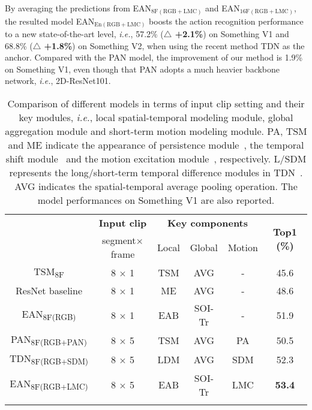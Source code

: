 By averaging the predictions from EAN$_{\operatorname{8F(RGB+LMC)}}$ and EAN$_{\operatorname{16F(RGB+LMC)}}$, the resulted model EAN$_{\operatorname{En(RGB+LMC)}}$ boosts the action recognition performance to a new state-of-the-art level, \textit{i.e.}, 57.2\% (\textbf{$\bigtriangleup$ +2.1\%}) on Something V1 and 68.8\% (\textbf{$\bigtriangleup$ +1.8\%}) on Something V2, when using the recent method TDN as the anchor.
Compared with the PAN model, the improvement of our method is 1.9\% on Something V1, even though that PAN adopts a much heavier backbone network, \textit{i.e.}, 2D-ResNet101.


		\begin{table}[!tb]
			\caption{Comparison of different models in terms of input clip setting and their key modules, \textit{i.e.}, local spatial-temporal modeling module, global aggregation module and short-term motion modeling module.
				PA, TSM and ME indicate the appearance of persistence module~\cite{zhang2020pan}, the temporal shift module~\cite{lin2019tsm} and 
				the motion excitation module~\cite{li2020tea}, respectively. 
				L/SDM represents the long/short-term temporal difference modules in TDN~\cite{wang2020tdn}.
				AVG indicates the spatial-temporal average pooling operation.
				The model performances on Something V1 are also reported.
			}
		\centering
			\renewcommand{\arraystretch}{1.0}
			\setlength{\tabcolsep}{0.7mm}
			\begin{tabular}{cccccc}
				\Xhline{2\arrayrulewidth}
				\multirow{2}{*}{\textbf{Model}}& \multicolumn{1}{c}{\textbf{Input clip}} & \multicolumn{3}{c}{\textbf{Key components}} &
				\multirow{2}{*}{\textbf{Top1 (\%)}}
				 \\
				& segment$\times$frame  & Local   & Global  & Motion\\  
				\hline
				TSM\textsubscript{8F} & 8 $\times$ 1 & TSM & AVG &- & 45.6 \\
				ResNet baseline & 8 $\times$ 1 & ME & AVG &- & 48.6 \\
				
				EAN\textsubscript{8F(RGB)} & 8 $\times$ 1 & EAB & SOI-Tr &- &51.9 \\ 
				\hline
				PAN\textsubscript{8F(RGB+PAN)} & 8 $\times$ 5 & TSM & AVG & PA & 50.5 \\ 
				TDN\textsubscript{8F(RGB+SDM)} & 8 $\times$ 5 & LDM & AVG & SDM & 52.3\\
				EAN\textsubscript{8F(RGB+LMC)} & 8 $\times$ 5 & EAB & SOI-Tr & LMC & \textbf{53.4} \\ 
				
				\Xhline{2\arrayrulewidth}
			\end{tabular}
		
		\label{tab_method_compare}
	
\end{table}

